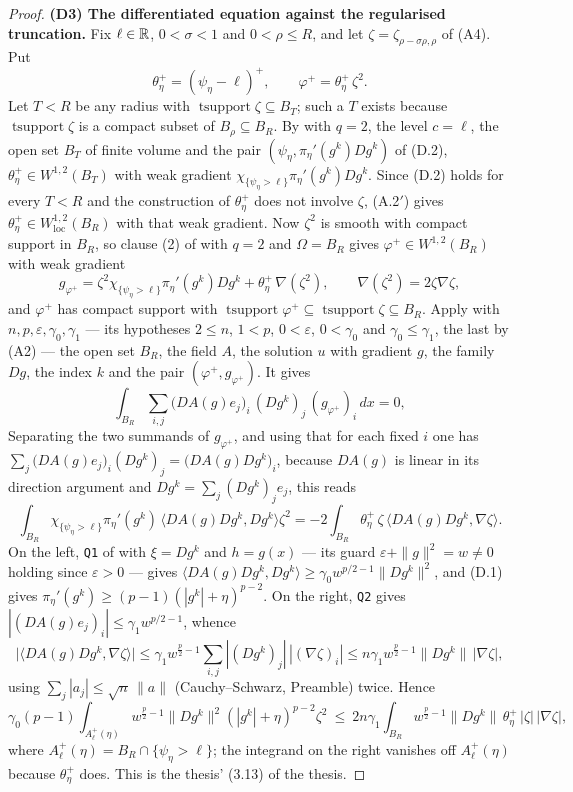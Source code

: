 \begin{proof}
\textbf{(D3) The differentiated equation against the regularised truncation.}
Fix $\ell\in\mathbb{R}$, $0<\sigma<1$ and $0<\rho\le R$, and let
$\zeta=\zeta_{\rho-\sigma\rho,\rho}$ of (A4).  Put
\[
\theta^+_\eta=(\psi_\eta-\ell)^+,\qquad \varphi^+=\theta^+_\eta\,\zeta^2 .
\]
Let $T<R$ be any radius with $\operatorname{tsupport}\zeta\subseteq B_T$; such a
$T$ exists because $\operatorname{tsupport}\zeta$ is a compact subset of
$B_\rho\subseteq B_R$.  By  with $q=2$, the
level $c=\ell$, the open set $B_T$ of finite volume and the pair
$(\psi_\eta,\pi_\eta'(g^k)Dg^k)$ of (D.2), $\theta^+_\eta\in W^{1,2}(B_T)$ with
weak gradient $\chi_{\{\psi_\eta>\ell\}}\pi_\eta'(g^k)Dg^k$.  Since (D.2) holds
for every $T<R$ and the construction of $\theta^+_\eta$ does not involve
$\zeta$, (A.2$'$) gives $\theta^+_\eta\in W^{1,2}_{\mathrm{loc}}(B_R)$ with that
weak gradient.  Now $\zeta^2$ is smooth with compact support in $B_R$, so clause
(2) of  with $q=2$ and $\Omega=B_R$ gives
$\varphi^+\in W^{1,2}(B_R)$ with weak gradient
\[
g_{\varphi^+}=\zeta^2\chi_{\{\psi_\eta>\ell\}}\pi_\eta'(g^k)Dg^k
+\theta^+_\eta\,\nabla(\zeta^2),
\qquad \nabla(\zeta^2)=2\zeta\nabla\zeta ,
\]
and $\varphi^+$ has compact support with
$\operatorname{tsupport}\varphi^+\subseteq\operatorname{tsupport}\zeta\subseteq
B_R$.  Apply  with
$n,p,\varepsilon,\gamma_0,\gamma_1$ --- its hypotheses $2\le n$, $1<p$,
$0<\varepsilon$, $0<\gamma_0$ and $\gamma_0\le\gamma_1$, the last by (A2) ---
the open set $B_R$, the field $A$, the solution $u$ with gradient $g$, the
family $Dg$, the index $k$ and the pair $(\varphi^+,g_{\varphi^+})$.  It gives
\[
\int_{B_R}\sum_{i,j}\bigl(DA(g)e_j\bigr)_i\,(Dg^k)_j\,(g_{\varphi^+})_i\,dx=0 ,
\]
Separating the two summands of $g_{\varphi^+}$, and using that for each fixed
$i$ one has $\sum_j\bigl(DA(g)e_j\bigr)_i(Dg^k)_j=\bigl(DA(g)Dg^k\bigr)_i$,
because $DA(g)$ is linear in its direction argument and
$Dg^k=\sum_j(Dg^k)_je_j$, this reads
\[
\int_{B_R}\chi_{\{\psi_\eta>\ell\}}\pi_\eta'(g^k)\,
\bigl\langle DA(g)Dg^k,Dg^k\bigr\rangle\zeta^2
=-2\int_{B_R}\theta^+_\eta\,\zeta\,
\bigl\langle DA(g)Dg^k,\nabla\zeta\bigr\rangle .
\]
On the left, \texttt{Q1} of  with $\xi=Dg^k$ and
$h=g(x)$ --- its guard $\varepsilon+\|g\|^2=w\ne0$ holding since
$\varepsilon>0$ --- gives
$\langle DA(g)Dg^k,Dg^k\rangle\ge\gamma_0w^{p/2-1}\|Dg^k\|^2$, and (D.1) gives
$\pi_\eta'(g^k)\ge(p-1)(|g^k|+\eta)^{p-2}$.  On the right, \texttt{Q2} gives
$|(DA(g)e_j)_i|\le\gamma_1w^{p/2-1}$, whence
\[
\bigl|\langle DA(g)Dg^k,\nabla\zeta\rangle\bigr|
\le\gamma_1w^{\frac p2-1}\sum_{i,j}|(Dg^k)_j|\,|(\nabla\zeta)_i|
\le n\gamma_1w^{\frac p2-1}\|Dg^k\|\,|\nabla\zeta| ,
\]
using $\sum_j|a_j|\le\sqrt n\,\|a\|$ (Cauchy--Schwarz, Preamble) twice.  Hence
\[
\gamma_0(p-1)\!\!\int_{A^+_\ell(\eta)}\!\!
w^{\frac p2-1}\|Dg^k\|^2(|g^k|+\eta)^{p-2}\zeta^2
\ \le\ 2n\gamma_1\!\!\int_{B_R}\!\!
w^{\frac p2-1}\|Dg^k\|\,\theta^+_\eta\,|\zeta|\,|\nabla\zeta| ,
\tag{D.3}
\]
where $A^+_\ell(\eta)=B_R\cap\{\psi_\eta>\ell\}$; the integrand on the right
vanishes off $A^+_\ell(\eta)$ because $\theta^+_\eta$ does.  This is the thesis'
(3.13) of the thesis.


\end{proof}
